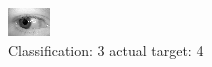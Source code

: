 \begin{figure}[h!]
\begin{center}
\includegraphics[width=0.60\columnwidth]{figures/ID752_class_3_target_4.png}
\end{center}
\caption{ Classification: 3 actual target: 4}
\label{fig:ID752_class_3_target_4}
\end{figure}
